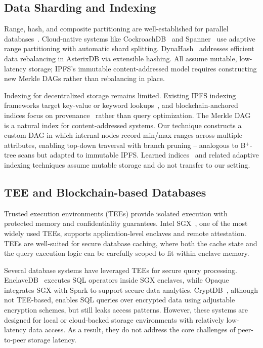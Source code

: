 \subsection{Data Sharding and Indexing}
\label{sec:sharding}

Range, hash, and composite partitioning are well-established for parallel databases~\cite{dewitt1992parallel}. Cloud-native systems like CockroachDB~\cite{taft2020cockroachdb} and Spanner~\cite{bacon2017spanner} use adaptive range partitioning with automatic shard splitting. DynaHash~\cite{luo2022dynahash} addresses efficient data rebalancing in AsterixDB via extensible hashing. All assume mutable, low-latency storage; IPFS's immutable content-addressed model requires constructing new Merkle DAGs rather than rebalancing in place.

Indexing for decentralized storage remains limited. Existing IPFS indexing frameworks target key-value or keyword lookups~\cite{arer2022efficient}, and blockchain-anchored indices focus on provenance~\cite{rathee2019blockchain} rather than query optimization. The Merkle DAG~\cite{benet2014ipfs, merkle1987digital} is a natural index for content-addressed systems. Our technique constructs a custom DAG in which internal nodes record min/max ranges across multiple attributes, enabling top-down traversal with branch pruning -- analogous to B$^+$-tree scans but adapted to immutable IPFS. Learned indices~\cite{kraska2018case} and related adaptive indexing techniques assume mutable storage and do not transfer to our setting.


\subsection{TEE and Blockchain-based Databases}
\label{sec:tee}

Trusted execution environments (TEEs) provide isolated execution with protected memory and confidentiality guarantees. Intel SGX~\cite{costan2016intel}, one of the most widely used TEEs, supports application-level enclaves and remote attestation. TEEs are well-suited for secure database caching, where both the cache state and the query execution logic can be carefully scoped to fit within enclave memory.

Several database systems have leveraged TEEs for secure query processing. EnclaveDB~\cite{priebe2018enclavedb} executes SQL operators inside SGX enclaves, while Opaque~\cite{zheng2017opaque} integrates SGX with Spark to support secure data analytics. CryptDB~\cite{popa2011cryptdb}, although not TEE-based, enables SQL queries over encrypted data using adjustable encryption schemes, but still leaks access patterns. However, these systems are designed for local or cloud-backed storage environments with relatively low-latency data access. As a result, they do not address the core challenges of peer-to-peer storage latency.

